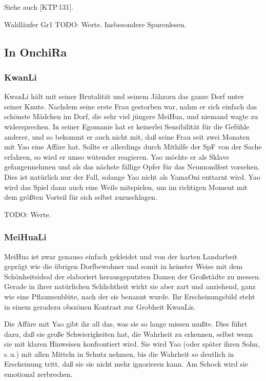\documentclass[
a4paper,
twoside,
DIV=calc,
BCOR=4mm,
fontsize=9pt,
twocolumn=on,
titlepage=on,
parskip=half
]{scrartcl}
\begin{document}
Siehe auch [KTP\,131].

Waldläufer Gr1
TODO: Werte. Insbesondere Spurenlesen.

\subsection{In OnchiRa}

\subsubsection{KwanLi}

KwanLi hält mit seiner Brutalität und seinem Jähzorn das ganze Dorf
unter seiner Knute. Nachdem seine erste Frau gestorben war, nahm er
sich einfach das schönste Mädchen im Dorf, die sehr viel jüngere
MeiHua, und niemand wagte zu widersprechen. In seiner Egomanie hat er
keinerlei Sensibilität für die Gefühle anderer, und so bekommt er auch
nicht mit, daß seine Frau seit zwei Monaten mit Yao eine Affäre
hat. Sollte er allerdings durch Mithilfe der SpF von der Sache
erfahren, so wird er umso wütender reagieren. Yao möchte er als Sklave
gefangennehmen und als das nächste fällige Opfer für das Neumondfest
vorsehen. Dies ist natürlich nur der Fall, solange Yao nicht als
YamaOni enttarnt wird. Yao wird das Spiel dann auch eine Weile
mitspielen, um im richtigen Moment mit dem größten Vorteil für sich
selbst zuzuschlagen. 

TODO: Werte.

\subsubsection{MeiHuaLi}

MeiHua ist zwar genauso einfach gekleidet und von der harten
Landarbeit geprägt wie die übrigen Dorfbewohner und somit in keinster
Weise mit dem Schönheitsideal der elaboriert herausgeputzten Damen der
Großstädte zu messen. Gerade in ihrer natürlichen Schlichtheit wirkt
sie aber zart und anziehend, ganz wie eine Pflaumenblüte, nach der sie
benannt wurde. Ihr Erscheinungsbild steht in einem geradezu obszönen
Kontrast zur Grobheit KwanLis.

Die Affäre mit Yao gibt ihr all das, was sie so lange missen
mußte. Dies führt dazu, daß sie große Schwierigkeiten hat, die
Wahrheit zu erkennen, selbst wenn sie mit klaren Hinweisen
konfrontiert wird. Sie wird Yao (oder später ihren Sohn, s.\,u.) mit
allen Mitteln in Schutz nehmen, bis die Wahrheit so deutlich in
Erscheinung tritt, daß sie sie nicht mehr ignorieren kann. Am Schock
wird sie emotional zerbrechen.
\end{document}

